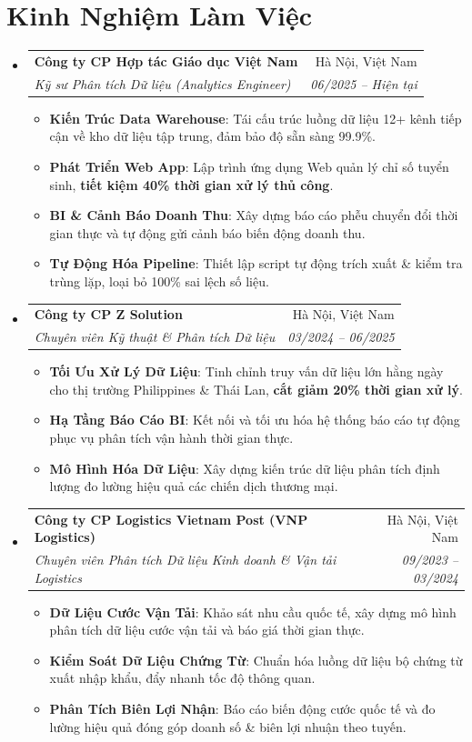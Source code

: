 \documentclass[letterpaper,11pt]{article}
\makeatletter
\newcommand{\resumeItem}[1]{
  \item\small{
    {#1 \vspace{1pt}}
  }
}
\newcommand{\resumeSubheading}[4]{
  \vspace{2pt}\item
    \begin{tabular*}{\textwidth}[t]{l@{\extracolsep{\fill}}r}
      \textbf{#1} & #2 \\
      \textit{\small#3} & \textit{\small #4} \\
    \end{tabular*}\vspace{-2pt}
}
\newcommand{\resumeSubHeadingListStart}{\begin{itemize}[leftmargin=0.15in, label={}]}
\newcommand{\resumeSubHeadingListEnd}{\end{itemize}}
\newcommand{\resumeItemListStart}{\begin{itemize}[leftmargin=0.15in, itemsep=2.5pt, topsep=2pt, parsep=1.5pt]}
\newcommand{\resumeItemListEnd}{\end{itemize}\vspace{2pt}}
\makeatother
\begin{document}
\section*{Kinh Nghiệm Làm Việc}
  \resumeSubHeadingListStart
        \resumeSubheading
      {Công ty CP Hợp tác Giáo dục Việt Nam}{Hà Nội, Việt Nam}
      {Kỹ sư Phân tích Dữ liệu (Analytics Engineer)}{06/2025 -- Hiện tại}
      \resumeItemListStart
      \resumeItem{\textbf{Kiến Trúc Data Warehouse}: Tái cấu trúc luồng dữ liệu 12+ kênh tiếp cận về kho dữ liệu tập trung, đảm bảo độ sẵn sàng 99.9\%.}
      \resumeItem{\textbf{Phát Triển Web App}: Lập trình ứng dụng Web quản lý chỉ số tuyển sinh, \textbf{tiết kiệm 40\% thời gian xử lý thủ công}.}
      \resumeItem{\textbf{BI \& Cảnh Báo Doanh Thu}: Xây dựng báo cáo phễu chuyển đổi thời gian thực và tự động gửi cảnh báo biến động doanh thu.}
      \resumeItem{\textbf{Tự Động Hóa Pipeline}: Thiết lập script tự động trích xuất \& kiểm tra trùng lặp, loại bỏ 100\% sai lệch số liệu.}
      \resumeItemListEnd
    \resumeSubheading
      {Công ty CP Z Solution}{Hà Nội, Việt Nam}
      {Chuyên viên Kỹ thuật \& Phân tích Dữ liệu}{03/2024 -- 06/2025}
      \resumeItemListStart
      \resumeItem{\textbf{Tối Ưu Xử Lý Dữ Liệu}: Tinh chỉnh truy vấn dữ liệu lớn hằng ngày cho thị trường Philippines \& Thái Lan, \textbf{cắt giảm 20\% thời gian xử lý}.}
      \resumeItem{\textbf{Hạ Tầng Báo Cáo BI}: Kết nối và tối ưu hóa hệ thống báo cáo tự động phục vụ phân tích vận hành thời gian thực.}
      \resumeItem{\textbf{Mô Hình Hóa Dữ Liệu}: Xây dựng kiến trúc dữ liệu phân tích định lượng đo lường hiệu quả các chiến dịch thương mại.}
      \resumeItemListEnd
    \resumeSubheading
      {Công ty CP Logistics Vietnam Post (VNP Logistics)}{Hà Nội, Việt Nam}
      {Chuyên viên Phân tích Dữ liệu Kinh doanh \& Vận tải Logistics}{09/2023 -- 03/2024}
      \resumeItemListStart
      \resumeItem{\textbf{Dữ Liệu Cước Vận Tải}: Khảo sát nhu cầu quốc tế, xây dựng mô hình phân tích dữ liệu cước vận tải và báo giá thời gian thực.}
      \resumeItem{\textbf{Kiểm Soát Dữ Liệu Chứng Từ}: Chuẩn hóa luồng dữ liệu bộ chứng từ xuất nhập khẩu, đẩy nhanh tốc độ thông quan.}
      \resumeItem{\textbf{Phân Tích Biên Lợi Nhận}: Báo cáo biến động cước quốc tế và đo lường hiệu quả đóng góp doanh số \& biên lợi nhuận theo tuyến.}
      \resumeItemListEnd
  \resumeSubHeadingListEnd

\end{document}
